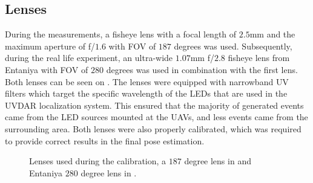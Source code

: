\subsection{Lenses}
During the measurements, a fisheye lens with a focal length of $2.5$mm and the maximum aperture of f/$1.6$ with \ac{FOV} of $187$ degrees was used. Subsequently, during the real life experiment, an ultra-wide $1.07$mm f/$2.8$ fisheye lens from Entaniya with \ac{FOV} of $280$ degrees was used in combination with the first lens. Both lenses can be seen on .
The lenses were equipped with narrowband \ac{UV} filters which target the specific wavelength of the \ac{LED}s that are used in the UVDAR localization system.
This ensured that the majority of generated events came from the \ac{LED} sources mounted at the \ac{UAV}s, and less events came from the surrounding area.
Both lenses were also properly calibrated, which was required to provide correct results in the final pose estimation.
\begin{figure}[H]
	\centering
	\caption{
		Lenses used during the calibration, a $187$ degree lens in  and Entaniya $280$ degree lens in .
  }
	\label{fig:lenses}
\end{figure}

